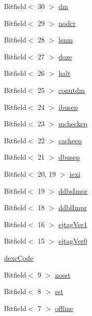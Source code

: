\begin{DoxyCompactItemize}
\item 
Bitfield$<$ 30 $>$ \hyperlink{namespaceMipsISA_a2575c29e7f4617b6076486f340b6fe19}{dm}
\item 
Bitfield$<$ 29 $>$ \hyperlink{namespaceMipsISA_a484f38d46faccff72aa369af4c8a086e}{nodcr}
\item 
Bitfield$<$ 28 $>$ \hyperlink{namespaceMipsISA_a43ec93d06a2a972f8174f9ecde90e30f}{lsnm}
\item 
Bitfield$<$ 27 $>$ \hyperlink{namespaceMipsISA_a25c92b67b9c868951dcc1346e05217ec}{doze}
\item 
Bitfield$<$ 26 $>$ \hyperlink{namespaceMipsISA_ad9f2d6a4c2b731f40aee4c97ef34dae2}{halt}
\item 
Bitfield$<$ 25 $>$ \hyperlink{namespaceMipsISA_a140c882200add713056d43320ae90ee7}{conutdm}
\item 
Bitfield$<$ 24 $>$ \hyperlink{namespaceMipsISA_ad1bd3d648866553f25f2ae129bb99f9e}{ibusep}
\item 
Bitfield$<$ 23 $>$ \hyperlink{namespaceMipsISA_a572d975ede660ebdf7718dcd5d05f6f4}{mcheckep}
\item 
Bitfield$<$ 22 $>$ \hyperlink{namespaceMipsISA_a297386c6b4091f227ba72fe86f438239}{cacheep}
\item 
Bitfield$<$ 21 $>$ \hyperlink{namespaceMipsISA_a232e039d9180cd3e75fb2eda2d0d1acb}{dbusep}
\item 
Bitfield$<$ 20, 19 $>$ \hyperlink{namespaceMipsISA_abe7a98fe9301fe8d59a3e645dfee043a}{iexi}
\item 
Bitfield$<$ 19 $>$ \hyperlink{namespaceMipsISA_a13a5d4103bddb375a0f242663295afae}{ddbsImpr}
\item 
Bitfield$<$ 18 $>$ \hyperlink{namespaceMipsISA_a7a90fa9c7206b92777493c9721c94afc}{ddblImpr}
\item 
Bitfield$<$ 16 $>$ \hyperlink{namespaceMipsISA_a2b92945dcf4bc82c985fa2531c7f3cdb}{ejtagVer1}
\item 
Bitfield$<$ 15 $>$ \hyperlink{namespaceMipsISA_a547268003f35ff887729001fd3303733}{ejtagVer0}
\item 
\hyperlink{namespaceMipsISA_ae9fba86af554b856990c68681e8cbdfd}{dexcCode}
\item 
Bitfield$<$ 9 $>$ \hyperlink{namespaceMipsISA_acf601f49a9be58c895649c74d23ee070}{nosst}
\item 
Bitfield$<$ 8 $>$ \hyperlink{namespaceMipsISA_a4cc396bf955458d1f8f838922167ee4a}{sst}
\item 
Bitfield$<$ 7 $>$ \hyperlink{namespaceMipsISA_a2049c9a70bdc8ee8d780d140564109d6}{offline}
\item 

\end{DoxyCompactItemize}
